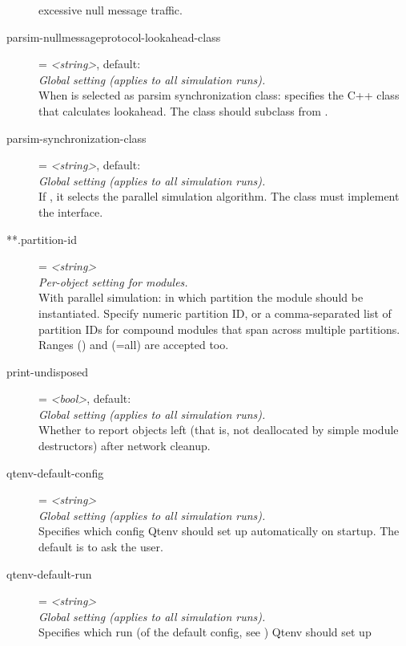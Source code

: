 \begin{description}
    excessive null message traffic.
\item[parsim-nullmessageprotocol-lookahead-class] = \textit{<string>}, default: \\
    \textit{Global setting (applies to all simulation runs).}\\
    When  is selected as parsim synchronization
    class: specifies the C++ class that calculates lookahead. The class should
    subclass from .
\item[parsim-synchronization-class] = \textit{<string>}, default: \\
    \textit{Global setting (applies to all simulation runs).}\\
    If , it selects the
    parallel simulation algorithm. The class must implement the
     interface.
\item[**.partition-id] = \textit{<string>}\\
    \textit{Per-object setting for modules.}\\
    With parallel simulation: in which partition the module should be
    instantiated. Specify numeric partition ID, or a comma-separated list of
    partition IDs for compound modules that span across multiple partitions.
    Ranges () and \ttt{*} (=all) are accepted too.
\item[print-undisposed] = \textit{<bool>}, default: \\
    \textit{Global setting (applies to all simulation runs).}\\
    Whether to report objects left (that is, not deallocated by simple module
    destructors) after network cleanup.
\item[qtenv-default-config] = \textit{<string>}\\
    \textit{Global setting (applies to all simulation runs).}\\
    Specifies which config Qtenv should set up automatically on startup. The
    default is to ask the user.
\item[qtenv-default-run] = \textit{<string>}\\
    \textit{Global setting (applies to all simulation runs).}\\
    Specifies which run (of the default config, see
    ) Qtenv should set up

\end{description}
